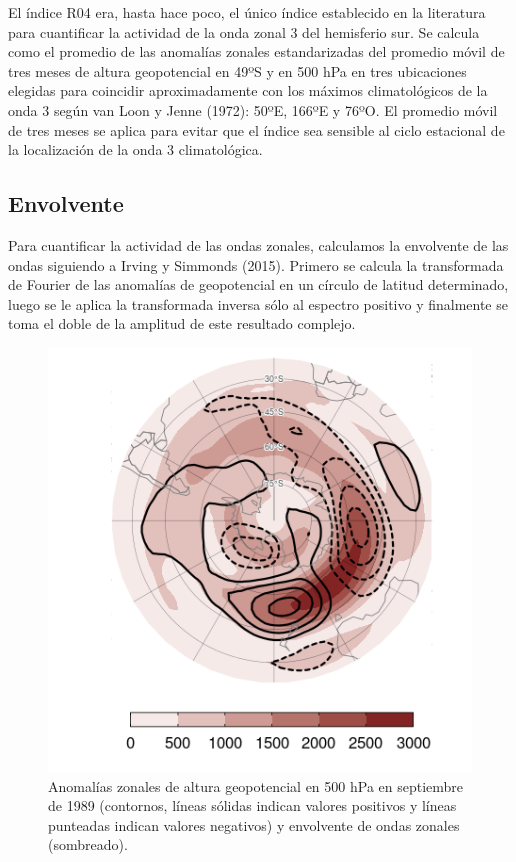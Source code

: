 \documentclass[12pt,oneside,a4paper]{reedthesis}
\begin{document}
El índice R04 era, hasta hace poco, el único índice establecido en la literatura para cuantificar la actividad de la onda zonal 3 del hemisferio sur.
Se calcula como el promedio de las anomalías zonales estandarizadas del promedio móvil de tres meses de altura geopotencial en 49ºS y en 500 hPa en tres ubicaciones elegidas para coincidir aproximadamente con los máximos climatológicos de la onda 3 según van Loon y Jenne (1972): 50ºE, 166ºE y 76ºO.
El promedio móvil de tres meses se aplica para evitar que el índice sea sensible al ciclo estacional de la localización de la onda 3 climatológica.

\hypertarget{envolvente}{%
\subsection{Envolvente}\label{envolvente}}

Para cuantificar la actividad de las ondas zonales, calculamos la envolvente de las ondas siguiendo a Irving y Simmonds (2015).
Primero se calcula la transformada de Fourier de las anomalías de geopotencial en un círculo de latitud determinado, luego se le aplica la transformada inversa sólo al espectro positivo y finalmente se toma el doble de la amplitud de este resultado complejo.

\begin{figure}

{\centering \includegraphics{figures/15-onda3/envolvente-ejemplo-1} 

}

\caption{Anomalías zonales de altura geopotencial en 500 hPa en septiembre de 1989 (contornos, líneas sólidas indican valores positivos y líneas punteadas indican valores negativos) y envolvente de ondas zonales (sombreado).}\label{fig:envolvente-ejemplo}
\end{figure}
\end{document}
